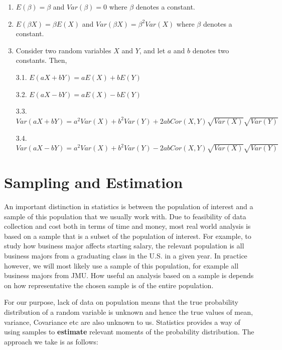 \documentclass[
]{book}
\theoremstyle{definition}
\theoremstyle{definition}
\theoremstyle{definition}
\theoremstyle{definition}
\theoremstyle{remark}
\begin{document}
\begin{enumerate}
\def\labelenumi{\arabic{enumi}.}
\item
  \(E(\beta)=\beta\) and \(Var(\beta)=0\) where \(\beta\) denotes a constant.
\item
  \(E(\beta X)= \beta E(X)\) and \(Var(\beta X)= \beta^2 Var(X)\) where \(\beta\) denotes a constant.
\item
  Consider two random variables \(X\) and \(Y\), and let \(a\) and \(b\) denotes two constants. Then,

  3.1. \(E(aX+bY)=aE(X)+bE(Y)\)

  3.2. \(E(aX-bY)=aE(X)-bE(Y)\)

  3.3. \(Var(aX+bY)=a^2 Var(X)+b^2 Var(Y)+2abCor(X,Y)\sqrt{Var(X)}\sqrt{Var(Y)}\)

  3.4. \(Var(aX-bY)=a^ 2Var(X)+b^2 Var(Y)-2abCor(X,Y)\sqrt{Var(X)}\sqrt{Var(Y)}\)
\end{enumerate}

\hypertarget{sampling-and-estimation}{%
\section{Sampling and Estimation}\label{sampling-and-estimation}}

An important distinction in statistics is between the population of interest and a sample of this population that we usually work with. Due to feasibility of data collection and cost both in terms of time and money, most real world analysis is based on a sample that is a subset of the population of interest. For example, to study how business major affects starting salary, the relevant population is all business majors from a graduating class in the U.S. in a given year. In practice however, we will most likely use a sample of this population, for example all business majors from JMU. How useful an analysis based on a sample is depends on how representative the chosen sample is of the entire population.

For our purpose, lack of data on population means that the true probability distribution of a random variable is unknown and hence the true values of mean, variance, Covariance etc are also unknown to us. Statistics provides a way of using samples to \textbf{estimate} relevant moments of the probability distribution. The approach we take is as follows:
\end{document}

